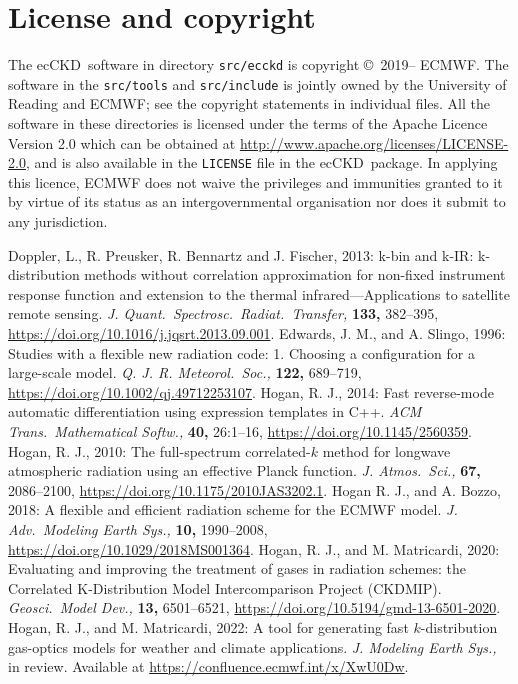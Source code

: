 \documentclass[a4,oneside]{article}
\def\codesize{\small}
\newcommand{\ecckd}{ecCKD}
\def\codesize{\small}
\def\code#1{{\codesize\texttt{#1}}}
\begin{document}
\section{License and copyright}
\label{sec:license}
The \ecckd\ software in directory \code{src/ecckd} is copyright
\copyright\ 2019-- ECMWF. The software in the \code{src/tools} and
\code{src/include} is jointly owned by the University of Reading and
ECMWF; see the copyright statements in individual files. All the
software in these directories is licensed under the terms of the
Apache Licence Version 2.0 which can be obtained at
\url{http://www.apache.org/licenses/LICENSE-2.0}, and is also
available in the \code{LICENSE} file in the \ecckd\ package.  In
applying this licence, ECMWF does not waive the privileges and
immunities granted to it by virtue of its status as an
intergovernmental organisation nor does it submit to any jurisdiction.

\begin{thebibliography}{00}
%    
Doppler, L.,
  R. Preusker, R. Bennartz and J. Fischer, 2013: {k-bin} and {k-IR}:
  k-distribution methods without correlation approximation for
  non-fixed instrument response function and extension to the thermal
  infrared---Applications to satellite remote
  sensing. \textit{J. Quant.\ Spectrosc.\ Radiat.\ Transfer,}
  \textbf{133,} 382--395,
  \url{https://doi.org/10.1016/j.jqsrt.2013.09.001}.
%
Edwards, J. M., and
  A. Slingo, 1996: Studies with a flexible new radiation code: 1.
  Choosing a configuration for a large-scale
  model. \textit{Q. J. R. Meteorol.\ Soc.,} \textbf{122,} 689--719,
  \url{https://doi.org/10.1002/qj.49712253107}.
%
Hogan, R. J., 2014: Fast
  reverse-mode automatic differentiation using expression templates in
  C++.  \textit{ACM Trans.\ Mathematical Softw.,} \textbf{40,}
  26:1--16, \url{https://doi.org/10.1145/2560359}.
%
Hogan, R. J., 2010: The
  full-spectrum correlated-$k$ method for longwave atmospheric
  radiation using an effective Planck
  function. \textit{J. Atmos.\ Sci.,} \textbf{67,} 2086--2100,
  \url{https://doi.org/10.1175/2010JAS3202.1}.
%
Hogan R. J., and
  A. Bozzo, 2018: A flexible and efficient radiation scheme for the
  ECMWF model. \emph{J. Adv.\ Modeling Earth Sys.,} \textbf{10,}
  1990--2008, \url{https://doi.org/10.1029/2018MS001364}.
%
Hogan, R. J., and
  M. Matricardi, 2020: Evaluating and improving the treatment of gases
  in radiation schemes: the Correlated K-Distribution Model
  Intercomparison Project (CKDMIP). \textit{Geosci.\ Model Dev.,}
  \textbf{13,} {6501--6521,}
  \url{https://doi.org/10.5194/gmd-13-6501-2020}.
%
Hogan, R. J., and
  M. Matricardi, 2022: A tool for generating fast $k$-distribution
  gas-optics models for weather and climate
  applications. \textit{J. Modeling Earth Sys.,} in review. Available
  at \url{https://confluence.ecmwf.int/x/XwU0Dw}.
\end{thebibliography}
\end{document}
